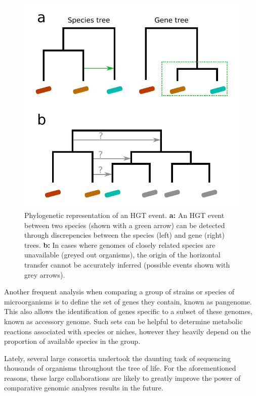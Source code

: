 \begin{figure}[htb]
    \includegraphics[width=\textwidth]{Parts/Part01/gfx/phylo_hgt.pdf}
    \caption[Phylogenetic representation of an HGT event.]{Phylogenetic representation of an HGT event. \textbf{a:} An HGT event between two species (shown with a green arrow) can be detected through discrepencies between the species (left) and gene (right) trees. \textbf{b:} In cases where genomes of closely related species are unavailable (greyed out organisms), the origin of the horizontal transfer cannot be accurately inferred (possible events shown with grey arrows).}
    \label{fig:01-03:phylo-hgt}
\end{figure}

Another frequent analysis when comparing a group of strains or species of microorganisms is to define the set of genes they contain, known as pangenome. This also allows the identification of genes specific to a  subset of these genomes, known as accessory genome. Such sets can be helpful to determine metabolic reactions associated with species or niches, however they heavily depend on the proportion of available species in the group.

Lately, several large consortia \citep{genome10kcommunityofscientistsGenome10KProposal2009,poelchauI5kWorkspaceNAL2015,DarwinTreeLife} undertook the daunting task of sequencing thousands of organisms throughout the tree of life. For the aforementioned reasons, these large collaborations are likely to greatly improve the power of comparative genomic analyses results in the future.

